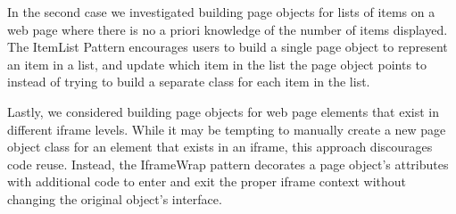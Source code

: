 In the second case we investigated building page objects for lists of items on
a web page where there is no a priori knowledge of the number of items
displayed.  The ItemList Pattern encourages users to build a single page object
to represent an item in a list, and update which item in the list the page
object points to instead of trying to build a separate class for each item in
the list.

Lastly, we considered building page objects for web page elements that exist in
different iframe levels. While it may be tempting to manually create a new page
object class for an element that exists in an iframe, this approach discourages
code reuse. Instead, the IframeWrap pattern decorates a page object's
attributes with additional code to enter and exit the proper iframe context
without changing the original object's interface.
